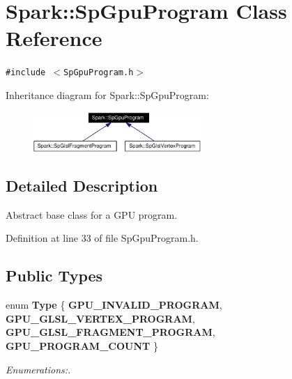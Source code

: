 \section{Spark::Sp\-Gpu\-Program Class Reference}
\label{classSpark_1_1SpGpuProgram}
{\tt \#include $<$Sp\-Gpu\-Program.h$>$}

Inheritance diagram for Spark::Sp\-Gpu\-Program:\begin{figure}[H]
\begin{center}
\leavevmode
\includegraphics[width=180pt]{classSpark_1_1SpGpuProgram__inherit__graph}
\end{center}
\end{figure}


\subsection{Detailed Description}
Abstract base class for a GPU program. 

Definition at line 33 of file Sp\-Gpu\-Program.h.\subsection*{Public Types}
\begin{CompactItemize}
\item 
enum {\bf Type} \{ {\bf GPU\_\-INVALID\_\-PROGRAM}, 
{\bf GPU\_\-GLSL\_\-VERTEX\_\-PROGRAM}, 
{\bf GPU\_\-GLSL\_\-FRAGMENT\_\-PROGRAM}, 
{\bf GPU\_\-PROGRAM\_\-COUNT}
 \}
\begin{CompactList}\small\item\em Enumerations:. \item\end{CompactList}\end{CompactItemize}
